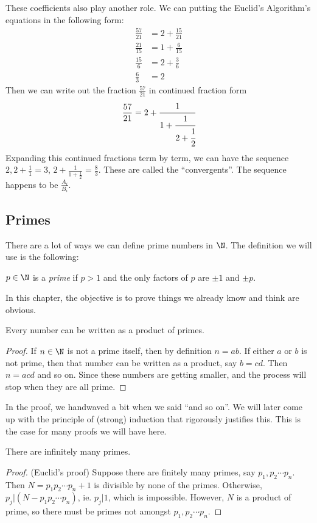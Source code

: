 \documentclass[a4paper]{article}
\begin{document}
These coefficients also play another role. We can putting the Euclid's Algorithm's equations in the following form:
\begin{align*}
  \frac{57}{21} &= 2 + \frac{15}{21}\\
  \frac{21}{15} &= 1 + \frac{6}{15}\\
  \frac{15}{6} &= 2 + \frac{3}{6}\\
  \frac{6}{3} &= 2
\end{align*}
Then we can write out the fraction $\frac{57}{21}$ in continued fraction form
\[
  \frac{57}{21} = 2 + \cfrac{1}{1 + \cfrac{1}{2 + \cfrac{1}{2}}}
\]
Expanding this continued fractions term by term, we can have the sequence $2, 2 + \frac{1}{1} = 3$, $2 + \frac{1}{1 + \frac{1}{2}} = \frac{8}{3}$. These are called the ``convergents''. The sequence happens to be $\frac{A_i}{B_i}$.

\subsection{Primes}
There are a lot of ways we can define prime numbers in $\N$. The definition we will use is the following:
\begin{defi}
  $p\in \N$ is a \emph{prime} if $p > 1$ and the only factors of $p$ are $\pm 1$ and $\pm p$.
\end{defi}
In this chapter, the objective is to prove things we already know and think are obvious.
\begin{thm}
  Every number can be written as a product of primes.
\end{thm}

\begin{proof}
  If $n\in \N$ is not a prime itself, then by definition $n = ab$. If either $a$ or $b$ is not prime, then that number can be written as a product, say $b = cd$. Then $n = acd$ and so on. Since these numbers are getting smaller, and the process will stop when they are all prime.
\end{proof}
In the proof, we handwaved a bit when we said ``and so on''. We will later come up with the principle of (strong) induction that rigorously justifies this. This is the case for many proofs we will have here.

\begin{thm}
  There are infinitely many primes.
\end{thm}

\begin{proof}
  (Euclid's proof) Suppose there are finitely many primes, say $p_1, p_2 \cdots p_n$. Then $N = p_1p_2\cdots p_n + 1$ is divisible by none of the primes.  Otherwise, $p_j|(N - p_1p_2\cdots p_n)$, ie. $p_j|1$, which is impossible. However, $N$ is a product of prime, so there must be primes not amongst $p_1, p_2\cdots p_n$.
\end{proof}
\end{document}
